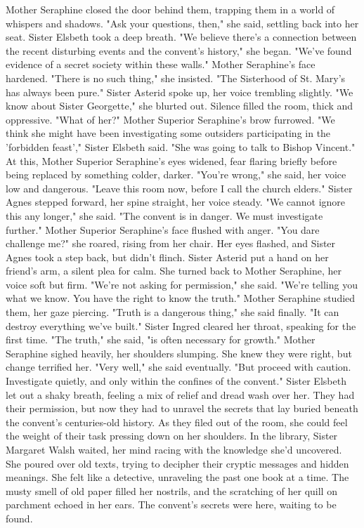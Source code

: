 \documentclass[11pt]{article}
\begin{document}
Mother Seraphine closed the door behind them, trapping them in a world of whispers and shadows. "Ask your questions, then," she said, settling back into her seat.
Sister Elsbeth took a deep breath. "We believe there's a connection between the recent disturbing events and the convent's history," she began. "We've found evidence of a secret society within these walls."
Mother Seraphine's face hardened. "There is no such thing," she insisted. "The Sisterhood of St. Mary's has always been pure."
Sister Asterid spoke up, her voice trembling slightly. "We know about Sister Georgette," she blurted out.
Silence filled the room, thick and oppressive. "What of her?" Mother Superior Seraphine's brow furrowed.
"We think she might have been investigating some outsiders participating in the 'forbidden feast'," Sister Elsbeth said. "She was going to talk to Bishop Vincent."
At this, Mother Superior Seraphine's eyes widened, fear flaring briefly before being replaced by something colder, darker. "You're wrong," she said, her voice low and dangerous. "Leave this room now, before I call the church elders."
Sister Agnes stepped forward, her spine straight, her voice steady. "We cannot ignore this any longer," she said. "The convent is in danger. We must investigate further."
Mother Superior Seraphine's face flushed with anger. "You dare challenge me?" she roared, rising from her chair. Her eyes flashed, and Sister Agnes took a step back, but didn't flinch.
Sister Asterid put a hand on her friend's arm, a silent plea for calm. She turned back to Mother Seraphine, her voice soft but firm. "We're not asking for permission," she said. "We're telling you what we know. You have the right to know the truth."
Mother Seraphine studied them, her gaze piercing. "Truth is a dangerous thing," she said finally. "It can destroy everything we've built."
Sister Ingred cleared her throat, speaking for the first time. "The truth," she said, "is often necessary for growth."
Mother Seraphine sighed heavily, her shoulders slumping. She knew they were right, but change terrified her. "Very well," she said eventually. "But proceed with caution. Investigate quietly, and only within the confines of the convent."
Sister Elsbeth let out a shaky breath, feeling a mix of relief and dread wash over her. They had their permission, but now they had to unravel the secrets that lay buried beneath the convent's centuries-old history. As they filed out of the room, she could feel the weight of their task pressing down on her shoulders.
In the library, Sister Margaret Walsh waited, her mind racing with the knowledge she'd uncovered. She poured over old texts, trying to decipher their cryptic messages and hidden meanings. She felt like a detective, unraveling the past one book at a time. The musty smell of old paper filled her nostrils, and the scratching of her quill on parchment echoed in her ears. The convent's secrets were here, waiting to be found.
\end{document}
